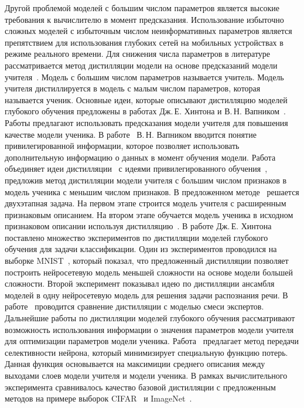 Другой проблемой моделей с большим числом параметров является высокие требования к вычислителю в момент предсказания. Использование избыточно сложных моделей с избыточным числом неинформативных параметров является препятствием для использования глубоких сетей на мобильных устройствах в режиме реального времени.
Для снижения числа параметров в литературе рассматривается метод дистилляции модели на основе предсказаний модели учителя~\cite{Hinton2015, Vapnik2015, Lopez2016}.
Модель с большим числом параметров называется учитель. Модель учителя дистиллируется в модель с малым числом параметров, которая называется ученик.
Основные идеи, которые описывают дистилляцию моделей глубокого обучения предложены в работах Дж.\,Е. Хинтона и В.\,Н. Вапником~\cite{Hinton2015, Vapnik2015, Lopez2016}.
Работы предлагают использовать предсказания модели учителя для повышения качестве модели ученика.
В работе~\cite{Vapnik2015} В.\,Н. Вапником вводится понятие привилегированной информации, которое позволяет использовать дополнительную информацию о данных в момент обучения модели.
Работа~\cite{Lopez2016} объединяет идеи дистилляции~\cite{Hinton2015} с идеями привилегированного обучения~\cite{Vapnik2015}, предложив метод дистилляции модели учителя с большим числом признаков в модель ученика с меньшим числом признаков.
В предложенном методе~\cite{Lopez2016} решается двухэтапная задача. На первом этапе строится модель учителя с расширенным признаковым описанием.
На втором этапе обучается модель ученика в исходном признаковом описании используя дистилляцию~\cite{Hinton2015}.
В работе Дж.\,Е. Хинтона~\cite{Hinton2015} поставлено множество экспериментов по дистилляции моделей глубокого обучения для задачи классификации.
Один из экспериментов проводился на выборке MNIST~\cite{mnist}, который показал, что предложенный дистилляции позволяет построить нейросетевую модель меньшей сложности на основе модели большей сложности.
Второй эксперимент показывал идею по дистилляции ансамбля моделей в одну нейросетевую модель для решения задачи распознания речи. В работе~\cite{Hinton2015} проводится сравнение дистилляции с моделью смеси экспертов.
Дальнейшие работы по дистилляции моделей глубокого обучения рассматривают возможность использования информации о значения параметров модели учителя для оптимизации параметров модели ученика. Работа~\cite{Zehao2017} предлагает метод передачи селективности нейрона, который минимизирует специальную функцию потерь. Данная функция основывается на максимиции среднего описания между выходами слоев модели учителя и модели ученика. В рамках вычислительного эксперимента сравнивалось качество базовой дистилляции с предложенным методов на примере выборок CIFAR~\cite{cifar10} и ImageNet~\cite{imagenet}.


